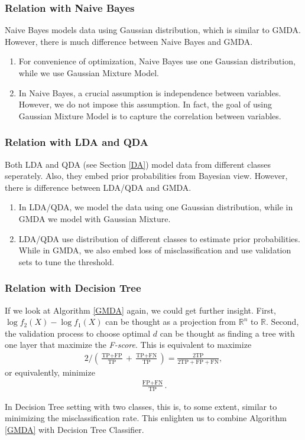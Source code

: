 \documentclass[english]{article}
\newenvironment{eqt}{\begin{equation}\begin{aligned}}{\end{aligned}\end{equation}}
\begin{document}
\subsubsection{Relation with Naive Bayes}
\par

Naive Bayes models data using Gaussian distribution, which is similar to GMDA. However, there is much difference between Naive Bayes and GMDA.
\begin{enumerate}
\item For convenience of optimization, Naive Bayes use one Gaussian distribution, while we use Gaussian Mixture Model.
\item In Naive Bayes, a crucial assumption is independence between variables. However, we do not impose this assumption. In fact, the goal of using Gaussian Mixture Model is to capture the correlation between variables.
\end{enumerate}

\subsubsection{Relation with LDA and QDA}
\par

Both LDA and QDA (see Section \ref{DA}) model data from different classes seperately. Also, they embed prior probabilities from Bayesian view. However, there is difference between LDA/QDA and GMDA.
\begin{enumerate}
\item In LDA/QDA, we model the data using one Gaussian distribution, while in GMDA we model with Gaussian Mixture.
\item LDA/QDA use distribution of different classes to estimate prior probabilities. While in GMDA, we also embed loss of misclassification and use validation sets to tune the threshold. 
\end{enumerate}

\subsubsection{Relation with Decision Tree}
\par

If we look at Algorithm \ref{GMDA} again, we could get further insight. First, $\log f_2(X) - \log f_1(X)$ can be thought as a projection from $\mathbb{R}^n$ to $\mathbb{R}$. Second, the validation process to choose optimal $d$ can be thought as finding a tree with one layer that maximize the \textit{F-score}. This is equivalent to maximize 
\begin{eqt}
2\bigg/\left(\frac{\text{TP}+\text{FP}}{\text{TP}}+\frac{\text{TP}+\text{FN}}{\text{TP}}\right) = \frac{2\text{TP}}{2\text{TP}+\text{FP}+\text{FN}},
\end{eqt}
or equivalently, minimize
\begin{eqt}
\frac{\text{FP} + \text{FN}}{\text{TP}}.
\end{eqt}
\par
In Decision Tree setting with two classes, this is, to some extent, similar to minimizing the misclassification rate. This enlighten us to combine Algorithm \ref{GMDA} with Decision Tree Classifier.
\end{document}
